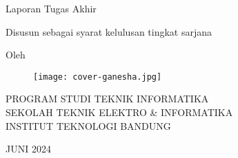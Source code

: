 \clearpage
\pagestyle{empty}

\begin{center}
  \smallskip

  \Large \bfseries \MakeUppercase{\thetitle}
  \vfill

  \Large Laporan Tugas Akhir
  \vfill

  \large Disusun sebagai syarat kelulusan tingkat sarjana
  \vfill

  \large Oleh

  \Large \theauthor

  \vfill
  \begin{figure}[!h]
    \centering
    \texttt{[image: cover-ganesha.jpg]}
  \end{figure}
  \vfill

  \large
  \uppercase{
    Program Studi Teknik Informatika \\
    Sekolah Teknik Elektro \& Informatika \\
    Institut Teknologi Bandung
  }

  {{JUNI}} {{2024}}

\end{center}

\clearpage
